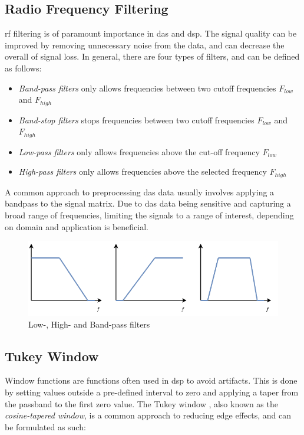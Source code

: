 \subsection{Radio Frequency Filtering}
%
\acrfull{rf} filtering is of paramount importance in \acrshort{das} and \acrfull{dsp}. The signal quality can be improved by removing unnecessary noise from the data, and can decrease the overall of signal loss. In general, there are four types of filters, and can be defined as follows:
%
\begin{itemize}
    \item \textit{Band-pass filters} only allows frequencies between two cutoff frequencies $F_{low}$ and $F_{high}$
    \item \textit{Band-stop filters} stops frequencies between two cutoff frequencies $F_{low}$ and $F_{high}$
    \item \textit{Low-pass filters} only allows frequencies above the cut-off frequency $F_{low}$
    \item \textit{High-pass filters} only allows frequencies above the selected frequency $F_{high}$
\end{itemize}
%
A common approach to preprocessing \acrshort{das} data usually involves applying a bandpass to the signal matrix. Due to \acrshort{das} data being sensitive and capturing a broad range of frequencies, limiting the signals to a range of interest, depending on domain and application is beneficial.

\vspace{0.5cm}

\begin{figure}[!h]
    \centering
    \includegraphics[width=0.8\linewidth]{figures/lowhighpass.png}
    \caption{Low-, High- and Band-pass filters}
    \label{fig:rffilters}
\end{figure}
%
\subsection{Tukey Window}
\label{dsp:tukey}

Window functions are functions often used in \acrshort{dsp} to avoid artifacts. This is done by setting values outside a pre-defined interval to zero and applying a taper from the passband to the first zero value. The Tukey window \cite{tukey1967introduction}, also known as the \textit{cosine-tapered window}, is a common approach to reducing edge effects, and can be formulated as such:

